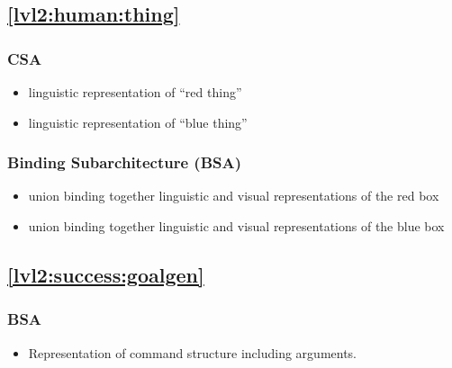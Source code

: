 \documentclass{article}
\begin{document}
\subsection{\ref{lvl2:human:thing}}

\subsubsection{CSA}

\begin{itemize}

\item linguistic representation of ``red thing''

\item linguistic representation of ``blue thing''

\end{itemize}


\subsubsection{Binding Subarchitecture (BSA)}

\begin{itemize}

\item union binding together linguistic and visual representations of
  the red box


\item union binding together linguistic and visual representations of
  the blue box

\end{itemize}






\subsection{\ref{lvl2:success:goalgen}}

\subsubsection{BSA}

\begin{itemize}

\item Representation of command structure including arguments.

\end{itemize}
\end{document}
